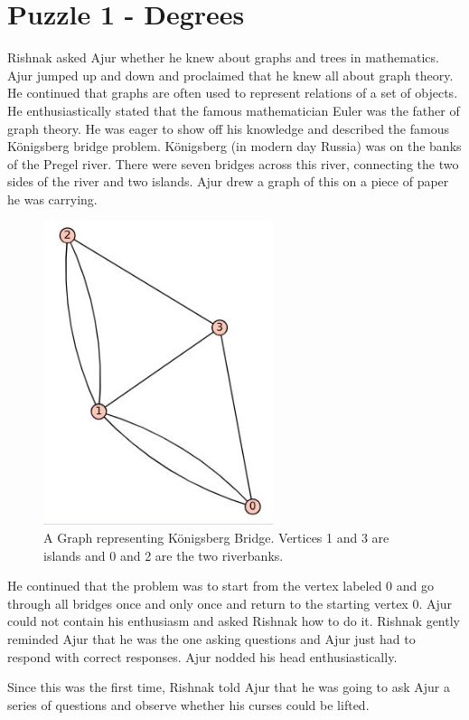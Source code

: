 \chapter{Puzzle 1 - Degrees}
Rishnak asked Ajur whether he knew about graphs and trees in mathematics. Ajur jumped up and down and proclaimed that he knew all about graph theory. He continued that graphs are often used to  represent relations of a set of objects. He enthusiastically stated that the famous mathematician Euler was the father of graph theory. He was eager to show off his knowledge and described the famous  K\"{o}nigsberg bridge problem.  K\"{o}nigsberg (in modern day Russia) was on the banks of the Pregel river.  There were seven bridges across this river, connecting the two sides of the river and two islands. Ajur drew a graph of this on a piece of paper he was carrying.
\begin{figure}
\includegraphics[width=0.6\textwidth]{konigsberg.JPG}
\caption{A Graph representing K\"{o}nigsberg Bridge. Vertices 1 and 3 are islands and 0 and 2 are the two riverbanks.}\label{kon}
\end{figure}

He continued that the problem was to start from the vertex labeled 0 and go through all bridges once and only once and return to the starting vertex 0. Ajur could not contain his enthusiasm and asked Rishnak how to do it. Rishnak gently reminded Ajur that he was the one asking questions and Ajur just had to respond with correct responses. Ajur nodded his head enthusiastically.

 Since this was the first time, Rishnak told Ajur that he was going to ask Ajur a series of questions and observe whether his curses could be lifted.
 
